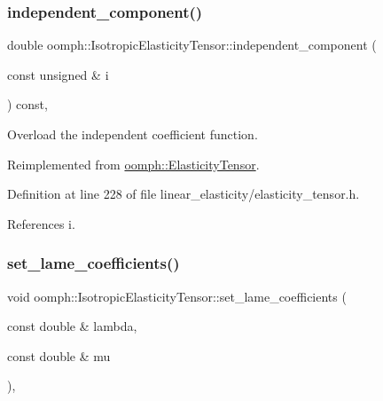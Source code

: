 \subsubsection{\texorpdfstring{independent\+\_\+component()}{independent\_component()}\hspace{0.1cm}{\footnotesize\ttfamily [2/2]}}
{\footnotesize\ttfamily double oomph\+::\+Isotropic\+Elasticity\+Tensor\+::independent\+\_\+component (\begin{DoxyParamCaption}\item[{const unsigned \&}]{i }\end{DoxyParamCaption}) const\hspace{0.3cm}{\ttfamily [inline]}, {\ttfamily [virtual]}}



Overload the independent coefficient function. 



Reimplemented from \hyperlink{classoomph_1_1ElasticityTensor_a84b2a9b7a447cf88b2d6b98b5e6e7bd5}{oomph\+::\+Elasticity\+Tensor}.



Definition at line 228 of file linear\+\_\+elasticity/elasticity\+\_\+tensor.\+h.



References i.

\mbox{\label{classoomph_1_1IsotropicElasticityTensor_a3e1d58b606d9ae2883403f24db1bb5b3}} 
\subsubsection{\texorpdfstring{set\+\_\+lame\+\_\+coefficients()}{set\_lame\_coefficients()}\hspace{0.1cm}{\footnotesize\ttfamily [1/2]}}
{\footnotesize\ttfamily void oomph\+::\+Isotropic\+Elasticity\+Tensor\+::set\+\_\+lame\+\_\+coefficients (\begin{DoxyParamCaption}\item[{const double \&}]{lambda,  }\item[{const double \&}]{mu }\end{DoxyParamCaption})\hspace{0.3cm}{\ttfamily [inline]}, {\ttfamily [private]}}



